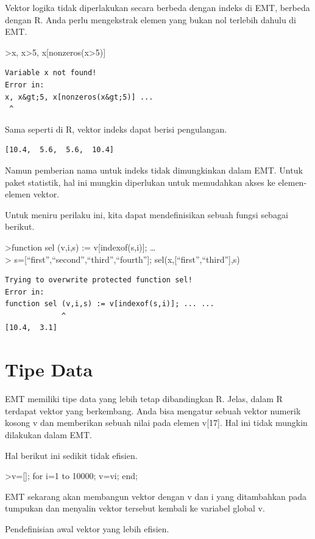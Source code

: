 \documentclass[
]{book}
\begin{document}
Vektor logika tidak diperlakukan secara berbeda dengan indeks di EMT, berbeda dengan R. Anda perlu mengekstrak elemen yang bukan nol terlebih dahulu di EMT.

\textgreater x, x\textgreater5, x{[}nonzeros(x\textgreater5){]}

\begin{verbatim}
Variable x not found!
Error in:
x, x&gt;5, x[nonzeros(x&gt;5)] ...
 ^
\end{verbatim}

Sama seperti di R, vektor indeks dapat berisi pengulangan.

\begin{verbatim}
[10.4,  5.6,  5.6,  10.4]
\end{verbatim}

Namun pemberian nama untuk indeks tidak dimungkinkan dalam EMT. Untuk paket statistik, hal ini mungkin diperlukan untuk memudahkan akses ke elemen-elemen vektor.

Untuk meniru perilaku ini, kita dapat mendefinisikan sebuah fungsi sebagai berikut.

\textgreater function sel (v,i,s) := v{[}indexof(s,i){]}; \ldots{}\\
\textgreater{} s={[}``first'',``second'',``third'',``fourth''{]}; sel(x,{[}``first'',``third''{]},s)

\begin{verbatim}
Trying to overwrite protected function sel!
Error in:
function sel (v,i,s) := v[indexof(s,i)]; ... ...
             ^
[10.4,  3.1]
\end{verbatim}

\chapter{Tipe Data}\label{tipe-data}

EMT memiliki tipe data yang lebih tetap dibandingkan R. Jelas, dalam R terdapat vektor yang berkembang. Anda bisa mengatur sebuah vektor numerik kosong v dan memberikan sebuah nilai pada elemen v{[}17{]}. Hal ini tidak mungkin dilakukan dalam EMT.

Hal berikut ini sedikit tidak efisien.

\textgreater v={[}{]}; for i=1 to 10000; v=v\textbar i; end;

EMT sekarang akan membangun vektor dengan v dan i yang ditambahkan pada tumpukan dan menyalin vektor tersebut kembali ke variabel global v.

Pendefinisian awal vektor yang lebih efisien.
\end{document}

